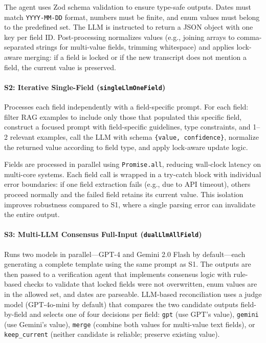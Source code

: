 The agent uses Zod schema validation to ensure type-safe outputs. Dates must match \texttt{YYYY-MM-DD} format, numbers must be finite, and enum values must belong to the predefined set. The LLM is instructed to return a JSON object with one key per field ID. Post-processing normalizes values (e.g., joining arrays to comma-separated strings for multi-value fields, trimming whitespace) and applies lock-aware merging: if a field is locked or if the new transcript does not mention a field, the current value is preserved.

\paragraph{S2: Iterative Single-Field (\texttt{singleLlmOneField})}
Processes each field independently with a field-specific prompt. For each field: filter RAG examples to include only those that populated this specific field, construct a focused prompt with field-specific guidelines, type constraints, and 1–2 relevant examples, call the LLM with schema \texttt{\{value, confidence\}}, normalize the returned value according to field type, and apply lock-aware update logic.

Fields are processed in parallel using \texttt{Promise.all}, reducing wall-clock latency on multi-core systems. Each field call is wrapped in a try-catch block with individual error boundaries: if one field extraction fails (e.g., due to API timeout), others proceed normally and the failed field retains its current value. This isolation improves robustness compared to S1, where a single parsing error can invalidate the entire output.

\paragraph{S3: Multi-LLM Consensus Full-Input (\texttt{dualLlmAllField})}
Runs two models in parallel—GPT-4 and Gemini 2.0 Flash by default—each generating a complete template using the same prompt as S1. The outputs are then passed to a verification agent that implements consensus logic with rule-based checks to validate that locked fields were not overwritten, enum values are in the allowed set, and dates are parseable. LLM-based reconciliation uses a judge model (GPT-4o-mini by default) that compares the two candidate outputs field-by-field and selects one of four decisions per field: \texttt{gpt} (use GPT's value), \texttt{gemini} (use Gemini's value), \texttt{merge} (combine both values for multi-value text fields), or \texttt{keep\_current} (neither candidate is reliable; preserve existing value).

